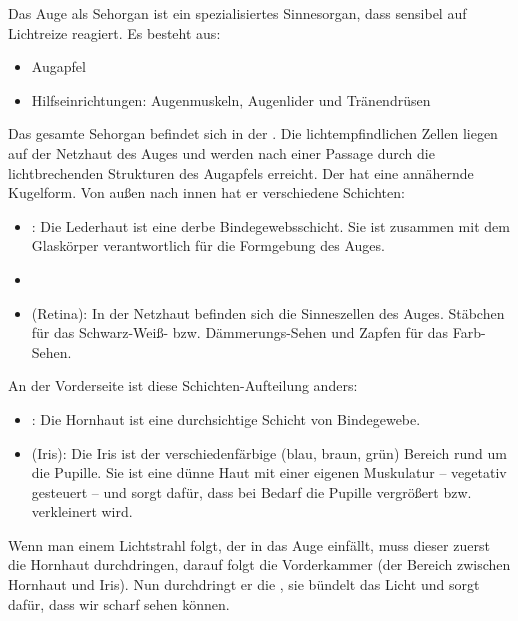 {%
Das Auge als Sehorgan ist ein spezialisiertes Sinnesorgan,
dass sensibel auf Lichtreize reagiert. Es besteht aus:

\begin{itemize}
  \item Augapfel
  \item Hilfseinrichtungen: Augenmuskeln, Augenlider und
  Tränendrüsen
\end{itemize} 

Das gesamte Sehorgan befindet sich in der . Die
lichtempfindlichen Zellen liegen auf der Netzhaut des Auges
und werden nach einer Passage durch die lichtbrechenden
Strukturen des Augapfels erreicht.
Der  hat eine annähernde Kugelform. Von außen nach
innen hat er verschiedene Schichten:

\begin{itemize}
  \item {} : Die Lederhaut ist eine
  derbe Bindegewebsschicht. Sie ist zusammen mit dem
  Glaskörper verantwortlich für die Formgebung des Auges.
  \item {}
  \item {} (Retina): In der Netzhaut befinden sich
  die Sinneszellen des Auges. Stäbchen für das Schwarz-Weiß-
  bzw. Dämmerungs-Sehen und Zapfen für das
  Farb-Sehen.
\end{itemize}
An der Vorderseite ist diese Schichten-Aufteilung anders:
\begin{itemize}
  \item {} : Die Hornhaut ist eine
  durchsichtige Schicht von Bindegewebe. 
  \item {} (Iris): Die Iris ist der
  verschiedenfärbige (blau, braun, grün) Bereich rund um die
  Pupille. Sie ist eine dünne Haut mit einer eigenen
  Muskulatur -- vegetativ gesteuert -- und sorgt dafür, dass
  bei Bedarf die Pupille vergrößert bzw. verkleinert wird.
\end{itemize}

Wenn man einem Lichtstrahl folgt, der in das Auge einfällt,
muss dieser zuerst die Hornhaut durchdringen, darauf folgt
die Vorderkammer (der Bereich zwischen Hornhaut und Iris).
Nun durchdringt er die , sie bündelt das Licht und
sorgt dafür, dass wir scharf sehen können.

}
